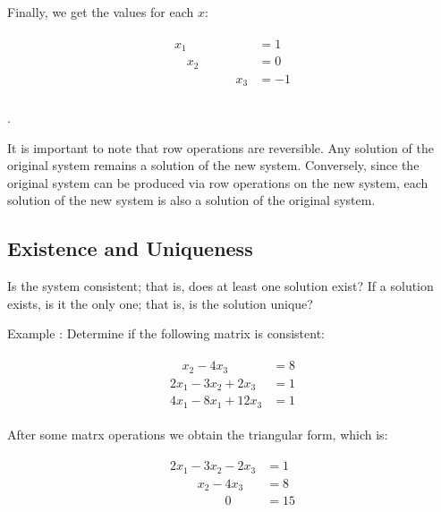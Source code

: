 \documentclass{article}
\begin{document}
\noindent Finally, we get the values for each $x$:

$$\begin{matrix} 
    \begin{aligned}
        x_1\phantom{x_2+x_3} &= 1\\
        \phantom{x_1} x_2 \phantom{+x_3} &= 0\\
        \phantom{x_1+} \phantom{2x_2 +} x_3 &= -1\\
    \end{aligned}
\end{matrix}$$

.\newline

It is important to note that row operations are reversible. Any solution of the original system remains a solution of the new system. Conversely, since the original system can be produced via row operations on the new system, each solution of the new system is also a solution of the original system.

\subsection{Existence and Uniqueness}

Is the system consistent; that is, does at least one solution exist?
If a solution exists, is it the only one; that is, is the solution unique?

Example : Determine if the following matrix is consistent: 

$$\begin{matrix} 
    \begin{aligned}
        \phantom{x_1} x_2 - 4x_3 &= 8\\
        2x_1 - 3x_2 + 2x_3 &= 1\\
        4x_1 - 8x_1 + 12x_3 &= 1
    \end{aligned}
\end{matrix}$$

\noindent After some matrx operations we obtain the triangular form, which is:

$$\begin{matrix} 
    \begin{aligned}
        2x_1 - 3x_2 - 2x_3 &= 1\\
        \phantom{x_1+} x_2 - 4x_3 &= 8\\
        \phantom{x_1 + x_2 +} 0 &= 15
    \end{aligned}
\end{matrix}$$
\end{document}
